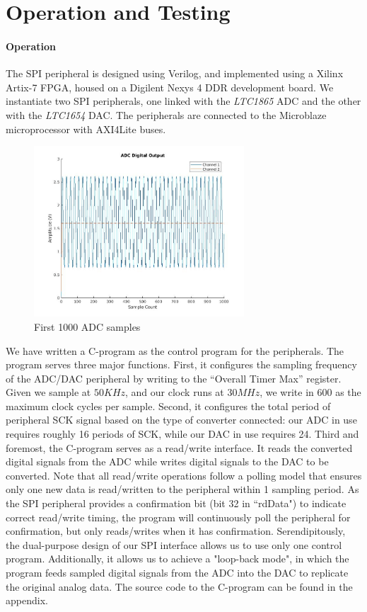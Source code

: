 \documentclass[conference]{IEEEtran}
\begin{document}
\section{Operation and Testing} \label{testing}

\paragraph{Operation}The SPI peripheral is designed using Verilog, and implemented using a Xilinx Artix-7 FPGA, housed on a Digilent Nexys\texttrademark{} 4 DDR development board. We instantiate two SPI peripherals, one linked with the \textit{LTC1865} ADC and the other with the \textit{LTC1654} DAC. The peripherals are connected to the Microblaze\textregistered{} microprocessor with AXI4Lite buses.


\begin{figure}[htbp]
    \centerline{\includegraphics[width=0.7\textwidth]{Figures/SPI/ADC_out.jpg}}
    \caption{First 1000 ADC samples}
    \label{ADC_OUT}
\end{figure}

We have written a C-program as the control program for the peripherals. The program serves three major functions. First, it configures the sampling frequency of the ADC/DAC peripheral by writing to the ``Overall Timer Max'' register. Given we sample at $50KHz$, and our clock runs at $30MHz$, we write in $600$ as the maximum clock cycles per sample. Second, it configures the total period of peripheral SCK signal based on the type of converter connected: our ADC in use requires roughly 16 periods of SCK, while our DAC in use requires 24. Third and foremost, the C-program serves as a read/write interface. It reads the converted digital signals from the ADC while writes digital signals to the DAC to be converted. Note that all read/write operations follow a polling model that ensures only one new data is read/written to the peripheral within 1 sampling period. As the SPI peripheral provides a confirmation bit (bit 32 in ``rdData") to indicate correct read/write timing, the program will continuously poll the peripheral for confirmation, but only reads/writes when it has confirmation. Serendipitously, the dual-purpose design of our SPI interface allows us to use only one control program. Additionally, it allows us to achieve a "loop-back mode", in which the program feeds sampled digital signals from the ADC into the DAC to replicate the original analog data. The source code to the C-program can be found in the appendix. 
\end{document}
